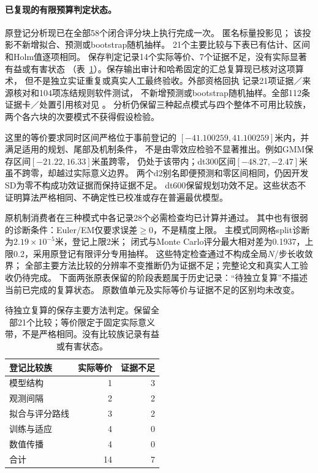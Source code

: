 \documentclass[UTF8,11pt]{ctexart}
\begin{document}
\paragraph{已复现的有限预算判定状态。}
\label{sec:saved-analysis-status}
原登记分析现已在全部58个闭合评分块上执行完成一次。
匿名标量投影见；
该投影不新增拟合、预测或bootstrap随机抽样。
21个主要比较与下表已有估计、区间和Holm值逐项相同。
保存判定记录14个实际等价、7个证据不足，没有实际显著有益或有害状态
（表~\ref{tab:saved-analysis-states}）。保存输出审计和哈希固定的汇总复算现已核对这项算术，
但不是独立实证重复或真实人工最终验收。外部资格回执
记录21项证据／来源核对和104项冻结规则软件测试，
不新增预测或bootstrap随机抽样。全部112条证据卡／处置引用核对见
。
分析仍保留三种起点模式与四个整体不可用比较族，两个各六块的次要模式不获得假设检验。

这里的等价要求同时区间严格位于事前登记的
$[-41.100259,41.100259]$米内，并满足适用的规划、尾部及机制条件，
不是由零效应检验不显著推出。例如GMM保存区间$[-21.22,16.33]$米虽跨零，
仍处于该带内；dt300区间$[-48.27,-2.47]$米虽不跨零，却越过实际意义边界。
两个d2别名即便预测和零区间相同，仍因开发SD为零不构成功效证据而保持证据不足。
dt600保留规划功效不足。这些状态不证明算法严格相同、不确定性已校准或存在普遍最优模型。

原机制消费者在三种模式中各记录28个必需检查均已计算并通过。
其中也有很弱的诊断条件：Euler/EM仅要求误差$\geq0$，不是精度上限。
主模式同网格split诊断为$2.19\times10^{-5}$米，登记上限2米；
闭式与Monte Carlo评分最大相对差为0.1937，上限0.2，采用原登记有限评分专用抽样。
这些特定检查通过不构成全局$N$/步长收敛界；
全部主要方法比较的分辨率不变推断仍为证据不足；完整论文和真实人工验收仍待完成。
下面两张原表保留的阶段表题属于历史记录：“待独立复算”不描述当前已完成的复算状态。
原数值单元及实际等价与证据不足的区别均未改变。

\begin{table}[htbp]
\centering\small
\caption{待独立复算的保存主要方法判定。保留全部21个比较；等价限定于固定实际意义带，不是严格相同。没有比较族记录有益或有害状态。}
\label{tab:saved-analysis-states}
\begin{tabular}{@{}lrr@{}}
\toprule
登记比较族 & 实际等价 & 证据不足\\
\midrule
模型结构 & 1 & 3\\
观测间隔 & 2 & 2\\
拟合与评分路线 & 3 & 2\\
训练与适应 & 4 & 0\\
数值传播 & 4 & 0\\
合计 & 14 & 7\\
\bottomrule
\end{tabular}
\end{table}
\end{document}
